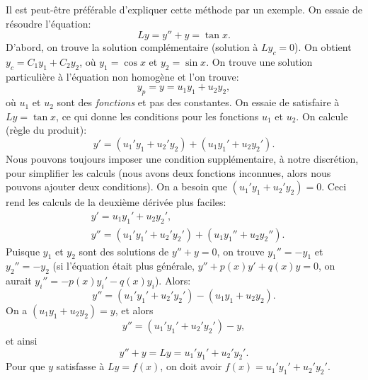 Il est peut-être préférable d'expliquer cette méthode par un exemple. 
On essaie de résoudre l'équation:  
\begin{equation*}
	Ly = y''+y = \tan x .
\end{equation*}
D'abord, on trouve la solution complémentaire (solution à $Ly_c = 0$).  
On obtient $y_c = C_1 y_1 + C_2 y_2$, où $y_1 = \cos x$ et $y_2 = \sin x$.
On trouve une solution particulière à l'équation non homogène et l'on trouve: 
\begin{equation*}
	y_p = y = u_1 y_1 + u_2 y_2, 
\end{equation*}
où $u_1$ et $u_2$ sont des \emph{fonctions} et pas des constantes.
On essaie de satisfaire à $Ly = \tan x$, ce qui donne les conditions pour les fonctions  $u_1$ et $u_2$.
On calcule (règle du produit):  
\begin{equation*}
	y' = (u_1' y_1 + u_2' y_2) + (u_1 y_1' + u_2 y_2').
\end{equation*}
Nous pouvons toujours imposer une condition supplémentaire, à notre discrétion, pour simplifier les calculs (nous avons deux fonctions inconnues, alors nous pouvons ajouter deux conditions). On a besoin que 
$(u_1' y_1 + u_2' y_2) = 0$.  Ceci rend les calculs de la deuxième dérivée plus faciles: 
\begin{align*}
	& y' = u_1 y_1' + u_2 y_2' , \\
	& y'' = (u_1' y_1' + u_2' y_2') + (u_1 y_1'' + u_2 y_2'') .
\end{align*}
Puisque $y_1$ et $y_2$ sont des solutions de $y''+y = 0$, on trouve 
$y_1'' = - y_1$ et $y_2'' = - y_2$ 
(si l'équation était plus générale,  $y''+p(x)y' +q(x)y = 0$, on aurait $y_i'' = -p(x)y_i' -q(x)y_i$).  
Alors: 
\begin{equation*}
	y'' = (u_1' y_1' + u_2' y_2') - (u_1 y_1 + u_2 y_2) .
\end{equation*}
On a $(u_1 y_1 + u_2 y_2) = y$, et alors
\begin{equation*}
	y'' = (u_1' y_1' + u_2' y_2') - y ,
\end{equation*}
et ainsi 
\begin{equation*}
	y'' + y = Ly = u_1' y_1' + u_2' y_2' .
\end{equation*}
Pour  que $y$ satisfasse à $Ly = f(x)$, on doit avoir
$f(x) = u_1' y_1' + u_2' y_2'$.

